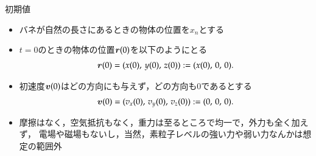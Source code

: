     \begin{mysmallsec}{初期値}
        \begin{itemize}
            \item バネが自然の長さにあるときの物体の位置を${x}_{n}$とする

            \item $t=0$のときの物体の位置$\boldsymbol{r}(0)$を以下のようにとる
                  \begin{align}
                      \boldsymbol{r}(0) = (x(0), \, y(0), \, z(0)) := (x(0),\,0,\,0).
                  \end{align}
            \item 初速度$\boldsymbol{v}(0)$はどの方向にも与えず，どの方向も0であるとする
                  \begin{align}
                      \boldsymbol{v}(0) = ({v}_{x}(0), \, {v}_{y}(0), \, {v}_{z}(0)) := (0,\,0,\,0).
                  \end{align}
            \item 摩擦はなく，空気抵抗もなく，重力は至るところで均一で，外力も全く加えず，
                  電場や磁場もないし，当然，素粒子レベルの強い力や弱い力なんかは想定の範囲外
        \end{itemize}
    \end{mysmallsec}

